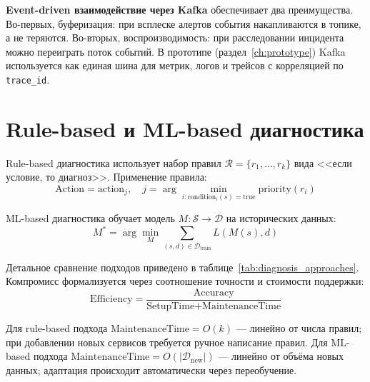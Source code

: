 \textbf{Event-driven взаимодействие через Kafka} обеспечивает два преимущества. Во-первых, буферизация: при всплеске алертов события накапливаются в топике, а не теряются. Во-вторых, воспроизводимость: при расследовании инцидента можно переиграть поток событий. В прототипе (раздел~\ref{ch:prototype}) Kafka используется как единая шина для метрик, логов и трейсов с корреляцией по \texttt{trace\_id}.

\section{Rule-based и ML-based диагностика}
\label{sec:rule_vs_ml}

Rule-based диагностика использует набор правил $\mathcal{R} = \{r_1, \ldots, r_k\}$ вида <<если условие, то диагноз>>. Применение правила:
\begin{equation}
\text{Action} = \text{action}_j, \quad j = \arg\min_{i: \text{condition}_i(s) = \text{true}} \text{priority}(r_i)
\label{eq:rule_application_paradigm}
\end{equation}

ML-based диагностика обучает модель $M: \mathcal{S} \to \mathcal{D}$ на исторических данных:
\begin{equation}
M^* = \arg\min_{M} \sum_{(s, d) \in \mathcal{D}_{\text{train}}} L(M(s), d)
\label{eq:ml_training_paradigm}
\end{equation}

Детальное сравнение подходов приведено в таблице~\ref{tab:diagnosis_approaches}. Компромисс формализуется через соотношение точности и стоимости поддержки:
\begin{equation}
\text{Efficiency} = \frac{\text{Accuracy}}{\text{SetupTime} + \text{MaintenanceTime}}
\label{eq:diagnosis_efficiency_paradigm}
\end{equation}

Для rule-based подхода $\text{MaintenanceTime} = O(k)$ --- линейно от числа правил; при добавлении новых сервисов требуется ручное написание правил. Для ML-based подхода $\text{MaintenanceTime} = O(|\mathcal{D}_{\text{new}}|)$ --- линейно от объёма новых данных; адаптация происходит автоматически через переобучение.

